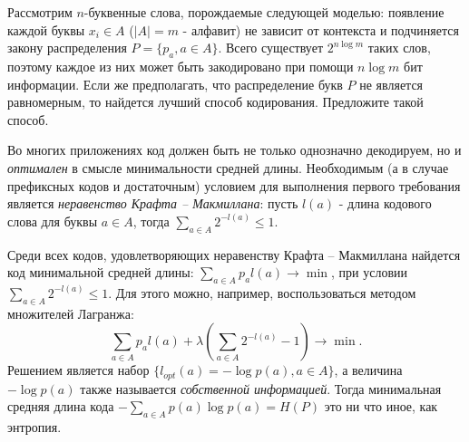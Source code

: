 \begin{problem}
Рассмотрим $n$-буквенные слова, порождаемые следующей моделью: появление каждой буквы $x_i \in A$ ($|A| = m$ - алфавит) не зависит от контекста и подчиняется закону распределения $P = \{p_a, a \in A\}$. Всего существует $2^{n\log m}$ таких слов, поэтому каждое из них может быть закодировано при помощи $n\log m$ бит информации. Если же предполагать, что распределение букв $P$ не является равномерным, то найдется лучший способ кодирования. Предложите такой способ.
\begin{comment}
\begin{ordre}
Воспользуйтесь результатами, полученными в предыдущих задачах.
\end{ordre}
\end{comment}
\end{problem}
\begin{comment}
НЕ ОЧЕНЬ УДАЧНОЕ ЗАМЕЧАНИЕ!

НУЖНО ПОЯСНИТЬ, ЧТО ТАКОЕ КОД?
В ЧЕМ РАЗЛИЧИЕ И ЧТО ТАКОЕ КОДЫ ХАФФМАНА И ШЕННОНА-ФАНО?
"Этот подход продемонстрирован в следующих задачах" - ЭТО НЕ ТАК!
\end{comment}
\begin{remark}
Во многих приложениях код должен быть не только однозначно декодируем, но и \textit{оптимален} в смысле минимальности средней длины. Необходимым (а в  случае префиксных кодов и достаточным) условием для выполнения первого требования является \textit{неравенство Крафта -- Макмиллана}: пусть $l(a)$ - длина кодового слова для буквы $a \in A$, тогда $\sum_{a \in A} 2^{-l(a)} \leq 1$.

Среди всех кодов, удовлетворяющих неравенству Крафта -- Макмиллана найдется код минимальной средней длины: $\sum_{a \in A} p_{a}l(a)\rightarrow \min$, при условии  $\sum_{a \in A} 2^{-l(a)} \leq 1$.  Для этого можно, например, воспользоваться методом множителей Лагранжа: $$
\sum_{a \in A} p_{a}l(a) + \lambda (\sum_{a \in A} 2^{-l(a)} - 1)\rightarrow \min.
$$ Решением является набор $\{l_{opt}(a) = -\log{p(a)}, a \in A\}$, а величина $-\log{p(a)}$ также называется \textit{собственной информацией}. Тогда минимальная средняя длина кода $-\sum_{a \in A}p(a)\log{p(a)} = H(P)$ это ни что иное, как энтропия.
\end{remark}

